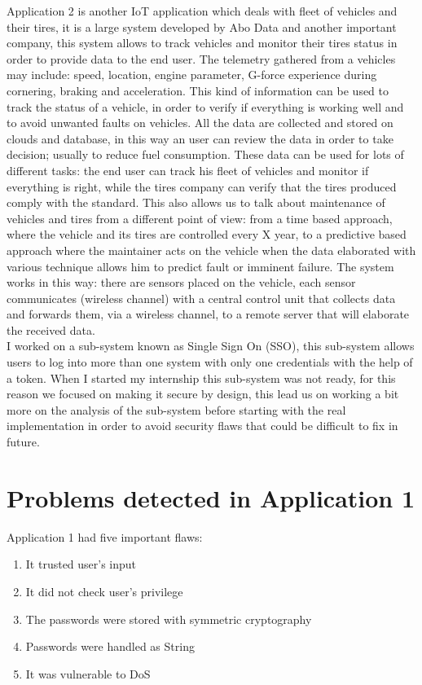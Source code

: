 Application 2 is another IoT application which deals with fleet of vehicles and their tires, it is a large system developed by Abo Data and another important company, 
this system allows to track vehicles and monitor their tires status in order to provide data to the end user.\newline
The telemetry gathered from a vehicles may include: speed, location, engine parameter, G-force experience during cornering, braking and acceleration.\newline
This kind of information can be used to track the status of a vehicle, in order to verify if everything is working well and to avoid unwanted faults on vehicles.\newline
All the data are collected and stored on clouds and database, in this way an user can review the data in order to take decision; usually to reduce fuel consumption.\newline
These data can be used for lots of different tasks: the end user can track his fleet of vehicles and monitor if everything is right, while the tires company can verify that the tires produced comply with the standard.\newline
This also allows us to talk about maintenance of vehicles and tires from a different point of view: from a time based
approach, where the vehicle and its tires are controlled every X year, to a predictive based approach where the maintainer acts on the vehicle when the data elaborated with various technique allows him to predict fault or imminent failure.\newline
The system works in this way: there are sensors placed on the vehicle, each sensor communicates (wireless channel) with a central control unit that collects data and forwards them,  via a wireless channel, to a remote server that will elaborate the received data.\\

I worked on a sub-system known as Single Sign On (SSO), this sub-system allows users to log into more than one system
with only one credentials with the help of a token.\newline
When I started my internship this sub-system was not ready, for this reason we focused on making it secure by design, this lead us on working a bit more on the analysis of the sub-system before starting with the real implementation in order to avoid security flaws that could be difficult to fix in future.\newline


\section{Problems detected in Application 1}
Application 1 had five important flaws:
\begin{enumerate}
	\item It trusted user’s input
	\item It did not check user’s privilege
	\item The passwords were stored with symmetric cryptography
	\item Passwords were handled as String
	\item It was vulnerable to DoS
\end{enumerate}

